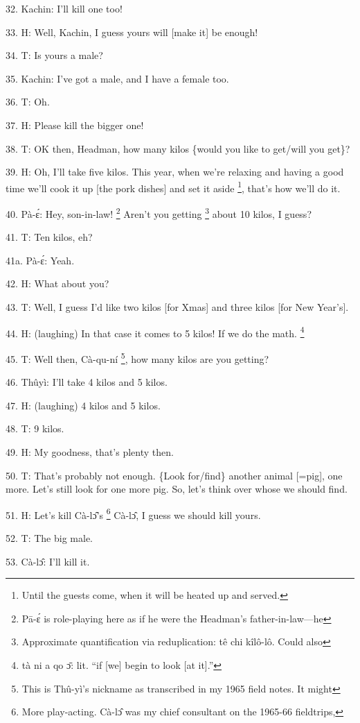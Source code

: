32. Kachin: I'll kill one too!

33. H: Well, Kachin, I guess yours will [make it] be enough!

34. T: Is yours a male?

35. Kachin: I've got a male, and I have a female too.

36. T: Oh.

37. H: Please kill the bigger one!

38. T: OK then, Headman, how many kilos \{would you like to get/will you get\}?

39. H: Oh, I'll take five kilos.  This year, when we're relaxing and having a good
time we'll cook it up [the pork dishes] and set it aside \footnote{Until the guests come, when it will be heated up and served.}, that's how we'll
do it.

40. Pà-ɛ́: Hey, son-in-law! \footnote{Pā-ɛ́ is role-playing here as if he were the Headman's father-in-law---he} Aren't you getting \footnote{Approximate quantification via reduplication: tê chi kîlô-lô.  Could also} about 10 kilos, I guess?

41. T: Ten kilos, eh?

41a. Pà-ɛ́: Yeah.

42. H: What about you?

43. T: Well, I guess I'd like two kilos [for Xmas] and three kilos [for New Year's].

44. H: (laughing) In that case it comes to 5 kilos!  If we do the math. \footnote{tà ni a qo ɔ̄: lit. ``if [we] begin to look [at it].''}

45. T: Well then, Cà-qu-ní \footnote{This is Thû-yì's nickname as transcribed in my 1965 field notes.  It might}, how many kilos are you getting?

46. Thûyì: I'll take 4 kilos and 5 kilos.

47. H: (laughing) 4 kilos and 5 kilos.

48. T: 9 kilos.

49. H: My goodness, that's plenty then.

50. T: That's probably not enough.  \{Look for/find\} another animal [=pig], one
more.  Let's still look for one more pig.  So, let's think over whose we should
find.

51. H: Let's kill Cà-lɔ̂'s \.\footnote{More play-acting.  Cà-lɔ̂ was my chief consultant on the 1965-66 fieldtrips,} Cà-lɔ̂, I guess we should kill yours.

52. T: The big male.

53. Cà-lɔ̂: I'll kill it.

